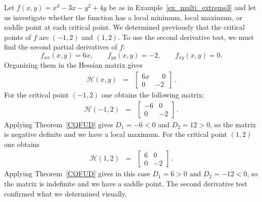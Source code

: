  \begin{example}
 \label{USDT}
Let $f(x,y) = x^3-3x-y^2+4y$ be as in Example~\ref{ex_multi_extreme3} and let us investigate whether the function has a local minimum, local maximum, or saddle point at each critical point.
We determined previously that the critical points of $f$ are $(-1,2)$ and $(1,2)$. To use the second derivative test, we must find the second partial derivatives of $f$:
$$f_{xx}(x,y) = 6x,\qquad f_{yy}(x,y) = -2,\qquad f_{xy}(x,y) = 0.$$
Organizing them in the Hessian matrix gives
\begin{eqnarray*}
\mathscr{H}(x,y) &=&  \begin{bmatrix} 6x & \quad 0 \\  0 & -2  \end{bmatrix} \,.
\end{eqnarray*}
For the critical point $(-1,2)$ one obtains the following matrix:
\begin{eqnarray*}
 \mathscr{H}(-1,2) &=& \begin{bmatrix} -6 & 0 \\ 0 & -2  \end{bmatrix} \,.
\end{eqnarray*}
Applying Theorem~\ref{CQFUD} gives $D_1 = -6 < 0$ and $D_2 = 12 >0$, so the matrix is negative definite and we have a local maximum. 
For the critical point $(1,2)$ one obtains 
\begin{eqnarray*} 
\mathscr{H}(1,2) &=& \begin{bmatrix} 6 & 0 \\ 0 & -2  \end{bmatrix} \,.
\end{eqnarray*}
Applying Theorem~\ref{CQFUD} gives in this case $D_1 = 6>0$ and $D_2 = -12 < 0$, so the matrix is indefinite and we have a saddle point. 
The second derivative test confirmed what we determined visually.
\end{example}

